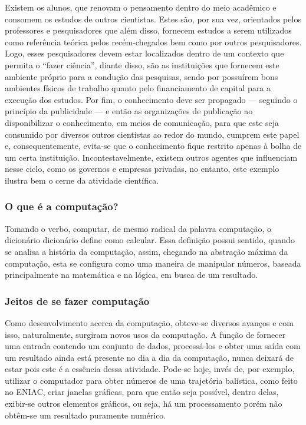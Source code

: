 Existem os alunos, que renovam o pensamento dentro do meio acadêmico e consomem os estudos de outros cientistas. Estes são, por sua vez, orientados pelos professores e pesquisadores que além disso, fornecem estudos a serem utilizados como referência teórica pelos recém-chegados bem como por outros pesquisadores. Logo, esses pesquisadores devem estar localizados dentro de um contexto que permita o ``fazer ciência'', diante disso, são as instituições que fornecem este ambiente próprio para a condução das pesquisas, sendo por possuírem bons ambientes físicos de trabalho quanto pelo financiamento de capital para a execução dos estudos. Por fim, o conhecimento deve ser propagado --- seguindo o princípio da publicidade ---  e então as organizações de publicação ao disponibilizar o conhecimento, em meios de comunicação, para que este seja consumido por diversos outros cientistas ao redor do mundo, cumprem este papel e, consequentemente, evita-se que o conhecimento fique restrito apenas à bolha de um certa instituição. Incontestavelmente, existem outros agentes que influenciam nesse ciclo, como os governos e empresas privadas, no entanto, este exemplo ilustra bem o cerne da atividade científica.


\subsubsection{O que é a computação?}
Tomando o verbo, computar, de mesmo radical da palavra computação, o dicionário dicionário define como calcular. Essa definição possui sentido, quando se analisa a história da computação, assim, chegando na abstração máxima da computação, esta se configura como uma maneira de manipular números, baseada principalmente na matemática e na lógica, em busca de um resultado. 

\subsubsection{Jeitos de se fazer computação}
Como desenvolvimento acerca da computação, obteve-se diversos avanços e com isso, naturalmente, surgiram novos usos da computação. A função de fornecer uma entrada contendo um conjunto de dados, processá-los e obter uma saída com um resultado ainda está presente no dia a dia da computação, nunca deixará de estar pois este é a essência dessa atividade. Pode-se hoje, invés de,  por exemplo, utilizar o computador para obter números de uma trajetória balística, como feito no ENIAC, criar janelas gráficas, para que então seja possível, dentro delas, exibir-se outros elementos gráficos, ou seja, há um processamento porém não obtêm-se um resultado puramente numérico. 

